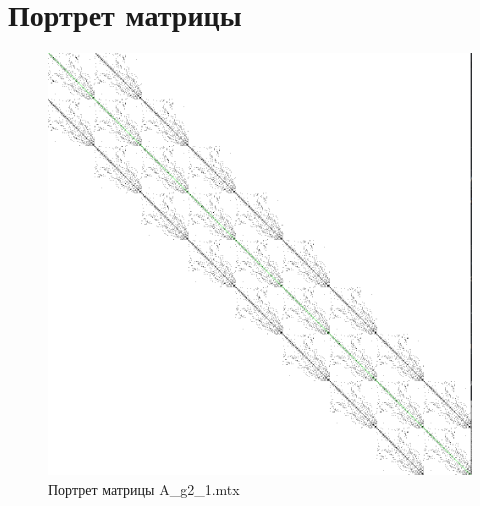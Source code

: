 	\section{Портрет матрицы}
	
	\begin{figure}[h!]
		\includegraphics[scale=0.5]{A_g2_1_portait.png}
		\caption{Портрет матрицы A_g2_1.mtx}
	\end{figure}
	
